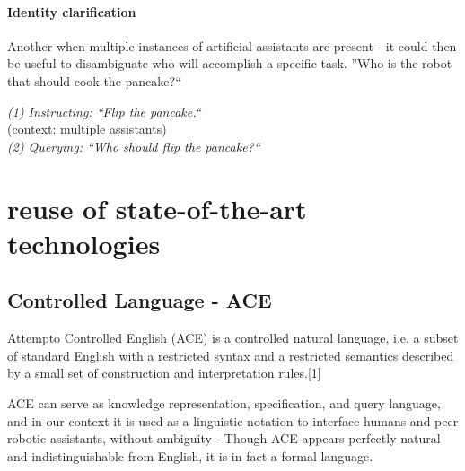 \documentclass[10pt,a4paper]{article}
\newcommand{\dialog}[3][(1)]{
  \textit{{(#1)} #2: {\color{Bittersweet} ``#3``}}\\}
\begin{document}



\paragraph{Identity clarification}
Another when multiple instances of artificial assistants are present - it could then be useful to disambiguate who will accomplish a specific task.
''Who is the robot that should cook the pancake?``

\dialog[1]{Instructing}{Flip the pancake.}
(context: multiple assistants)\\
\dialog[2]{Querying}{Who should flip the pancake?}


\section{reuse of state-of-the-art technologies}

\subsection{Controlled Language - ACE}


Attempto Controlled English (ACE) is a controlled natural language, i.e. a subset 
of standard English with a restricted syntax and a restricted semantics described 
by a small set of construction and interpretation rules.[1]

ACE can serve as knowledge representation, specification, and query language, and 
in our context it is used as a linguistic notation to interface humans and peer 
robotic assistants, without ambiguity - Though ACE appears perfectly natural and 
indistinguishable from English, it is in fact a formal language.
\end{document}
